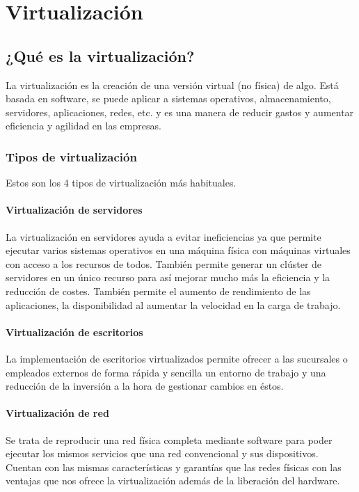 \chapter{Virtualización}

\section{¿Qué es la virtualización?}

La virtualización es la creación de una versión virtual (no física) de algo. Está basada en software, se puede aplicar a sistemas operativos, almacenamiento, servidores, aplicaciones, redes, etc. y es una manera de reducir gastos y aumentar eficiencia y agilidad en las empresas.

\subsection{Tipos de virtualización}

Estos son los 4 tipos de virtualización más habituales.
\subsubsection{Virtualización de servidores}

La virtualización en servidores ayuda a evitar ineficiencias ya que permite ejecutar varios sistemas operativos en una máquina física con máquinas virtuales con acceso a los recursos de todos. También permite generar un clúster de servidores en un único recurso para así mejorar mucho más la eficiencia y la reducción de costes. También permite el aumento de rendimiento de las aplicaciones, la disponibilidad al aumentar la velocidad en la carga de trabajo.

\subsubsection{Virtualización de escritorios}

La implementación de escritorios virtualizados permite ofrecer a las sucursales o empleados externos de forma rápida y sencilla un entorno de trabajo y una reducción de la inversión a la hora de gestionar cambios en éstos.

\subsubsection{Virtualización de red}

Se trata de reproducir una red física completa mediante software para poder ejecutar los mismos servicios que una red convencional y sus dispositivos. Cuentan con las mismas características y garantías que las redes físicas con las ventajas que nos ofrece la virtualización además de la liberación del hardware.

